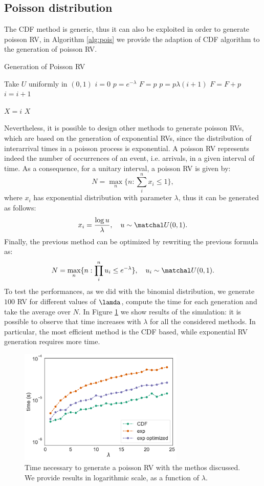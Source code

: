 \documentclass[twoside,onecolumn]{article}
\theoremstyle{definition}
\begin{document}
\subsection{Poisson distribution}
The CDF method is generic, thus it can also be exploited in order to generate poisson RV, in Algorithm \ref{alg:pois} we provide the adaption of CDF algorithm to the generation of poisson RV. 

\begin{algorithm}
\caption{Generation of Poisson RV}\label{alg:pois}
\begin{algorithmic}
\State Take $U$ uniformly in $(0,1)$
\State $i=0$
\State $p=e^{-\lambda}$
\State$F=p$
 \State$p = p\lambda(i+1)$
\State $F=F+p$
\State $i=i+1$
\EndWhile

\State$ X=i$
\State\Return $X$
\end{algorithmic}
\end{algorithm}
Nevertheless, it is possible to design other methods to generate poisson RVs, which are based on the generation of exponential RVs, since the distribution of interarrival times in a poisson process is exponential. A poisson RV represents indeed the number of occurrences of an event, i.e. arrivals, in a given interval of time. As a consequence, for a unitary interval, a poisson RV is given by:
\begin{equation}
N = \max_n\{n: \sum_i^n x_i \leq 1\}, 
\end{equation}
where $x_i$ has exponential distribution with parameter $\lambda$, thus it can be generated as follows:
\begin{equation}
x_i = \frac{\log u}{\lambda}, \quad u\sim \matchal U(0,1).
\end{equation}
Finally, the previous method can be optimized by rewriting the previous formula as:
\begin{equation}
N = \max_n\{n: \prod_i^n u_i \leq e^{-\lambda}\}, \quad u_i\sim \matchal U(0,1).
\end{equation}
To test the performances, as we did with the binomial distribution, we generate $100$ RV for different values of $\lamda$, compute the time for each generation and take the average over $N$. In Figure \ref{fig:poisson_time} we show results of the simulation: it is possible to observe that time increases with $\lambda$ for all the considered methods. In particular, the most efficient method is the CDF based, while exponential RV generation requires more time.


\begin{figure} \centering
         \includegraphics[width=0.7\textwidth]{../results/poisson_time.pdf}
\caption{Time necessary to generate a poisson RV with the methos discussed. We provide results in logarithmic scale, as a function of $\lambda$.}\label{fig:poisson_time}
\end{figure}
\end{document}
